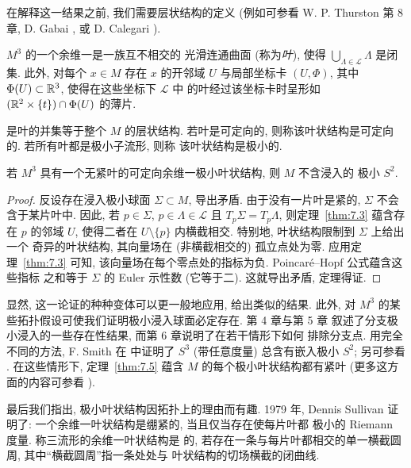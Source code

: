 在解释这一结果之前, 我们需要层状结构的定义 (例如可参看 W. P. Thurston
\cite{Th} 第 8 章, D. Gabai \cite{Ga}, 或 D. Calegari \cite{Ci}).

\begin{definition}[层状结构]
\label{def:7.4}
$M^3$ 的一个余维一是一族互不相交的
光滑连通曲面 (称为\emph{叶}), 使得 $\bigcup_{\Lambda\in\mathcal{L}}\Lambda$
是闭集. 此外, 对每个 $x\in M$ 存在 $x$ 的开邻域 $U$ 与局部坐标卡
$(U,\Phi)$, 其中 $\Phi(U)\subset\mathbb{R}^3$, 使得在这些坐标下 $\mathcal{L}$ 中
的叶经过该坐标卡时呈形如 $(\mathbb{R}^2\times\{t\})\cap\Phi(U)$ 的薄片.
\end{definition}

是叶的并集等于整个 $M$ 的层状结构.
若叶是可定向的, 则称该叶状结构是可定向的. 若所有叶都是极小子流形, 则称
该叶状结构是极小的.

\begin{theorem}
\label{thm:7.5}
若 $M^3$ 具有一个无紧叶的可定向余维一极小叶状结构, 则 $M$ 不含浸入的
极小 $S^2$.
\end{theorem}

\begin{proof}
反设存在浸入极小球面 $\Sigma\subset M$, 导出矛盾. 由于没有一片叶是紧的,
$\Sigma$ 不会含于某片叶中. 因此, 若 $p\in\Sigma$, $p\in\Lambda\in\mathcal{L}$
且 $T_p\Sigma=T_p\Lambda$, 则定理~\ref{thm:7.3} 蕴含存在 $p$ 的邻域 $U$, 使得二者在
$U\setminus\{p\}$ 内横截相交. 特别地, 叶状结构限制到 $\Sigma$ 上给出一个
奇异的叶状结构, 其向量场在 (非横截相交的) 孤立点处为零. 应用定理~\ref{thm:7.3}
可知, 该向量场在每个零点处的指标为负. Poincaré--Hopf 公式蕴含这些指标
之和等于 $\Sigma$ 的 Euler 示性数 (它等于二). 这就导出矛盾, 定理得证.
\end{proof}

显然, 这一论证的种种变体可以更一般地应用, 给出类似的结果. 此外, 对
$M^3$ 的某些拓扑假设可使我们证明极小浸入球面必定存在. 第 4 章与第 5 章
叙述了分支极小浸入的一些存在性结果, 而第 6 章说明了在若干情形下如何
排除分支点. 用完全不同的方法, F. Smith 在 \cite{Sm} 中证明了 $S^3$
(带任意度量) 总含有嵌入极小 $S^2$; 另可参看 \cite{CD}. 在这些情形下,
定理~\ref{thm:7.5} 蕴含 $M$ 的每个极小叶状结构都有紧叶 (更多这方面的内容可参看
\cite{Ha}).

最后我们指出, 极小叶状结构因拓扑上的理由而有趣. 1979 年, Dennis Sullivan
\cite{Du2} 证明了: 一个余维一叶状结构是绷紧的, 当且仅当存在使每片叶都
极小的 Riemann 度量. 称三流形的余维一叶状结构是
的, 若存在一条与每片叶都相交的单一横截圆周, 其中``横截圆周''指一条处处与
叶状结构的切场横截的闭曲线.

